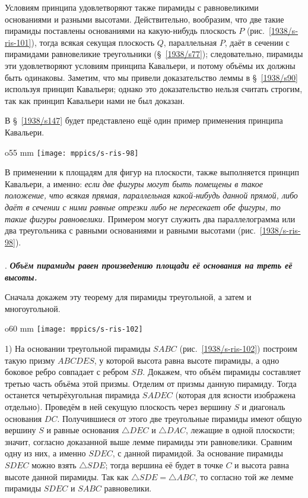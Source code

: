 Условиям принципа удовлетворяют также пирамиды с равновеликими основаниями и разными высотами.
Действительно, вообразим, что две такие пирамиды поставлены основаниями на какую-нибудь плоскость $P$ (рис.~\ref{1938/s-ris-101}), тогда всякая секущая плоскость $Q$, параллельная $P$, даёт в сечении с пирамидами равновеликие треугольники (§~\ref{1938/s77});
следовательно, пирамиды эти удовлетворяют условиям принципа Кавальери, и потому объёмы их должны быть одинаковы.
Заметим, что мы привели доказательство леммы в §~\ref{1938/s90} используя принцип Кавальери;
однако это доказательство нельзя считать строгим, так как принцип Кавальери нами не был доказан.

В §~\ref{1938/s147} будет представлено ещё один пример применения принципа Кавальери.

\begin{wrapfigure}{o}{55 mm}
\vskip-0mm
\centering
\texttt{[image: mppics/s-ris-98]}
\caption{}\label{1938/s-ris-98}
\vskip-0mm
\end{wrapfigure}

В применении к площадям для фигур на плоскости, также выполняется принцип Кавальери, а именно: 
\emph{если две фигуры могут быть помещены в такое положение, что всякая прямая, параллельная какой-нибудь данной прямой, либо даёт в сечении с ними равные отрезки либо не пересекает обе фигуры, то такие фигуры равновелики.}
Примером могут служить два параллелограмма или два треугольника с равными основаниями и равными высотами (рис.~\ref{1938/s-ris-98}).

\paragraph{}\label{1938/s91}
.
\textbf{\emph{Объём пирамиды равен произведению площади её основания на треть её высоты.}}

Сначала докажем эту теорему для пирамиды треугольной, а затем и многоугольной.


\begin{wrapfigure}{o}{60 mm}
\vskip-0mm
\centering
\texttt{[image: mppics/s-ris-102]}
\caption{}\label{1938/s-ris-102}
\vskip-0mm
\end{wrapfigure}

1) На основании треугольной пирамиды $SABC$ (рис.~\ref{1938/s-ris-102}) построим такую призму $ABCDES$, у которой высота равна высоте пирамиды, а одно боковое ребро совпадает с ребром $SB$.
Докажем, что объём пирамиды составляет третью часть объёма этой призмы.
Отделим от призмы данную пирамиду.
Тогда останется четырёхугольная пирамида $SADEC$ (которая для ясности изображена отдельно).
Проведём в ней секущую плоскость через вершину $S$ и диагональ основания $DC$.
Получившиеся от этого две треугольные пирамиды имеют общую вершину $S$ и равные основания $\triangle DEC$ и $\triangle DAC$, лежащие в одной плоскости;
значит, согласно доказанной выше лемме пирамиды эти равновелики.
Сравним одну из них, а именно $SDEC$, с данной пирамидой.
За основание пирамиды $SDEC$ можно взять $\triangle SDE$;
тогда вершина её будет в точке $C$ и высота равна высоте данной пирамиды.
Так как $\triangle SDE=\triangle ABC$, то согласно той же лемме пирамиды $SDEC$ и $SABC$ равновелики.

